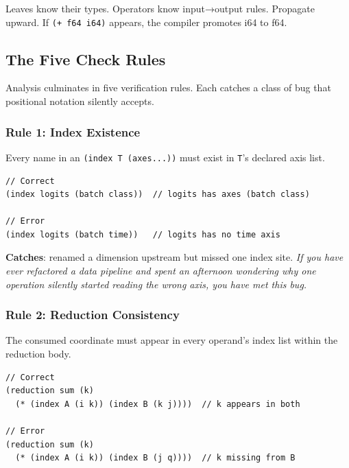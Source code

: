 \documentclass[11pt,titlepage]{article}
\begin{document}
Leaves know their types. Operators know input→output rules. Propagate
upward. If \texttt{(+\ f64\ i64)} appears, the compiler promotes i64 to
f64.

\vspace{2em}

\hypertarget{the-five-check-rules}{%
\subsection{The Five Check Rules}\label{the-five-check-rules}}

Analysis culminates in five verification rules. Each catches a class of
bug that positional notation silently accepts.

\hypertarget{rule-1-index-existence}{%
\subsubsection{Rule 1: Index Existence}\label{rule-1-index-existence}}

Every name in an \texttt{(index\ T\ (axes...))} must exist in
\texttt{T}'s declared axis list.

\begin{verbatim}
// Correct
(index logits (batch class))  // logits has axes (batch class)

// Error
(index logits (batch time))   // logits has no time axis
\end{verbatim}

\textbf{Catches}: renamed a dimension upstream but missed one index
site. \emph{If you have ever refactored a data pipeline and spent an
afternoon wondering why one operation silently started reading the wrong
axis, you have met this bug.}

\hypertarget{rule-2-reduction-consistency}{%
\subsubsection{Rule 2: Reduction
Consistency}\label{rule-2-reduction-consistency}}

The consumed coordinate must appear in every operand's index list within
the reduction body.

\begin{verbatim}
// Correct
(reduction sum (k)
  (* (index A (i k)) (index B (k j))))  // k appears in both

// Error
(reduction sum (k)
  (* (index A (i k)) (index B (j q))))  // k missing from B
\end{verbatim}
\end{document}
